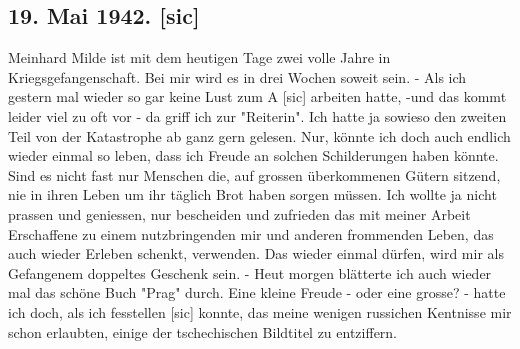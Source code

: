 \subsection{19. Mai 1942.{\color{red} [sic] }}

Meinhard Milde ist mit dem heutigen Tage zwei volle Jahre in Kriegsgefangenschaft.
Bei mir wird es in drei Wochen soweit sein.
- Als ich gestern mal wieder so gar keine Lust zum A{\color{red} [sic] } arbeiten hatte, -und das kommt leider viel zu oft vor - da griff ich zur "Reiterin".
Ich hatte ja sowieso den zweiten Teil von der Katastrophe ab ganz gern gelesen.
Nur, k\"{o}nnte ich doch auch endlich wieder einmal so leben, dass ich Freude an solchen Schilderungen haben k\"{o}nnte.
Sind es nicht fast nur Menschen die, auf grossen \"{u}berkommenen G\"{u}tern sitzend, nie in ihren Leben um ihr t\"{a}glich Brot haben sorgen m\"{u}ssen.
Ich wollte ja nicht prassen und geniessen, nur bescheiden und zufrieden das mit meiner Arbeit Erschaffene zu einem nutzbringenden mir und anderen frommenden Leben, das auch wieder Erleben schenkt, verwenden.
Das wieder einmal d\"{u}rfen, wird mir als Gefangenem doppeltes Geschenk sein.
- Heut morgen bl\"{a}tterte ich auch wieder mal das sch\"{o}ne Buch "Prag" durch.
Eine kleine Freude - oder eine grosse? - hatte ich doch, als ich fesstellen{\color{red} [sic] } konnte, das meine wenigen russichen Kentnisse mir schon erlaubten, einige der tschechischen Bildtitel zu entziffern.

\clearpage
